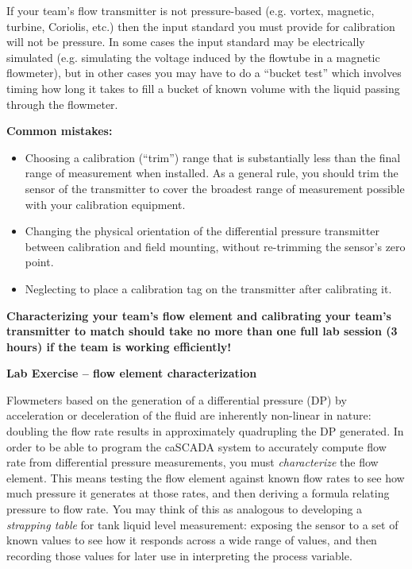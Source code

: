 If your team's flow transmitter is not pressure-based (e.g. vortex, magnetic, turbine, Coriolis, etc.) then the input standard you must provide for calibration will not be pressure.  In some cases the input standard may be electrically simulated (e.g. simulating the voltage induced by the flowtube in a magnetic flowmeter), but in other cases you may have to do a ``bucket test'' which involves timing how long it takes to fill a bucket of known volume with the liquid passing through the flowmeter.

\vskip 10pt

{\bf Common mistakes:}

\begin{itemize}
\item{} Choosing a calibration (``trim'') range that is substantially less than the final range of measurement when installed.  As a general rule, you should trim the sensor of the transmitter to cover the broadest range of measurement possible with your calibration equipment.
\item{} Changing the physical orientation of the differential pressure transmitter between calibration and field mounting, without re-trimming the sensor's zero point.  
\item{} Neglecting to place a calibration tag on the transmitter after calibrating it.
\end{itemize}

\vskip 10pt

{\bf Characterizing your team's flow element and calibrating your team's transmitter to match should take no more than one full lab session (3 hours) if the team is working efficiently!}






\vfil \eject

\noindent
{\bf Lab Exercise -- flow element characterization}

\vskip 5pt

Flowmeters based on the generation of a differential pressure (DP) by acceleration or deceleration of the fluid are inherently non-linear in nature: doubling the flow rate results in approximately quadrupling the DP generated.  In order to be able to program the caSCADA system to accurately compute flow rate from differential pressure measurements, you must {\it characterize} the flow element.  This means testing the flow element against known flow rates to see how much pressure it generates at those rates, and then deriving a formula relating pressure to flow rate.  You may think of this as analogous to developing a {\it strapping table} for tank liquid level measurement: exposing the sensor to a set of known values to see how it responds across a wide range of values, and then recording those values for later use in interpreting the process variable.

